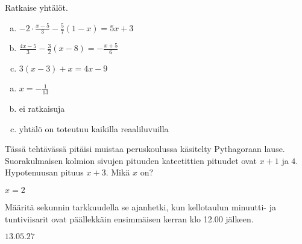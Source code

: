 \begin{tehtava}
    Ratkaise yhtälöt.
    \begin{enumerate}[(a)]
        \item $-2\cdot\frac{x-5}{3}-\frac{5}{7}(1-x)=5x+3$
        \item $\frac{4x-5}{3}-\frac{3}{2}(x-8)=-\frac{x+5}{6}$
        \item $3(x-3)+x=4x-9$
    \end{enumerate}
    \begin{vastaus}
        \begin{enumerate}[(a)]
            \item $x = -\frac{1}{13}$
            \item ei ratkaisuja
            \item yhtälö on toteutuu kaikilla reaaliluvuilla
        \end{enumerate}
    \end{vastaus}
\end{tehtava}

\begin{tehtava}
 
    \begin{vastaus}
		
    \end{vastaus}
\end{tehtava}

\begin{tehtava}
    Tässä tehtävässä pitäisi muistaa peruskoulussa käsitelty Pythagoraan lause.
    Suorakulmaisen kolmion sivujen pituuden kateetittien pituudet ovat $x+1$ ja $4$. Hypotenuusan pituus $x+3$. Mikä $x$ on?
    \begin{vastaus}
		$x=2$
    \end{vastaus}
\end{tehtava}

\begin{tehtava}
    Määritä sekunnin tarkkuudella se ajanhetki, kun kellotaulun minuutti- ja tuntiviisarit ovat päällekkäin ensimmäisen kerran klo 12.00 jälkeen.
    \begin{vastaus}
		$13.05.27$
    \end{vastaus}
\end{tehtava}
